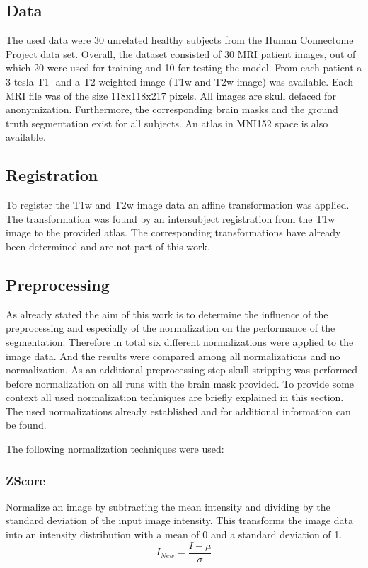 \documentclass[journal]{IEEEtran}
\begin{document}
\subsection{Data}
	The used data were 30 unrelated healthy subjects from the Human Connectome Project data set. Overall, the dataset consisted of 30 MRI patient images,
	out of which 20 were used for training and 10 for testing the model. From each patient a 3 tesla T1- and a T2-weighted image (T1w and T2w image) was available. Each MRI file
	was of the size 118x118x217 pixels. All images are skull defaced for anonymization.
	Furthermore, the corresponding brain masks and the ground truth segmentation exist for all subjects. An atlas in MNI152 space is also available.

\subsection{Registration}
	To register the T1w and T2w image data an affine transformation was applied. The transformation was found by 
	an intersubject registration from the T1w image to the provided atlas. The corresponding transformations have already been determined
	and are not part of this work. 

\subsection{Preprocessing}
	As already stated the aim of this work is to determine the influence of the preprocessing and especially of the normalization on the performance of the segmentation.
	Therefore in total six different normalizations were applied to the image data. And the results were compared among all normalizations and no normalization.
	As an additional preprocessing step skull stripping was performed before normalization on all runs with the brain mask provided. To provide some context all used normalization techniques are briefly explained in this 
	section. The used normalizations already established and for additional information can be found. 

	The following normalization techniques were used:
		
	\subsubsection{ZScore}
		Normalize an image by subtracting the mean intensity and dividing by the standard deviation of the input image intensity.
		This transforms the image data into an intensity distribution with a mean of 0 and a standard deviation of 1.
			\begin{equation}\label{ZScore}
				I_{New} = \frac{I - \mu}{\sigma}
			\end{equation}
		
\end{document}
